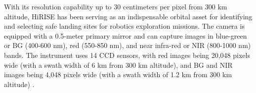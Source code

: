 With its resolution capability up to 30 centimeters per pixel from 300 km altitude, HiRISE has been serving as an indispensable orbital asset for identifying and selecting safe landing sites for robotics exploration missions. The camera is equipped with a 0.5-meter primary mirror and can capture images in blue-green or BG (400-600 nm), red (550-850 nm), and near infra-red or NIR (800-1000 nm) bands. The instrument uses 14 CCD sensors, with red images being 20,048 pixels wide (with a swath width of 6 km from 300 km altitude), and BG and NIR images being 4,048 pixels wide (with a swath width of 1.2 km from 300 km altitude) \cite{hirise_specs}.
